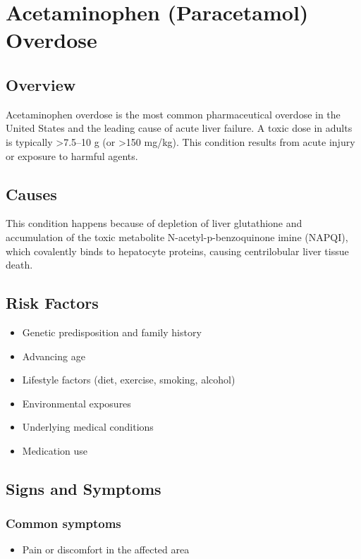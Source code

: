 \chapter{Acetaminophen (Paracetamol) Overdose}
\label{sec:Acetaminophen Overdose}

\section{Overview}
Acetaminophen overdose is the most common pharmaceutical overdose in the United States and the leading cause of acute liver failure. A toxic dose in adults is typically >7.5--10 g (or >150 mg/kg). This condition results from acute injury or exposure to harmful agents.
\section{Causes}
This condition happens because of depletion of liver glutathione and accumulation of the toxic metabolite N-acetyl-p-benzoquinone imine (NAPQI), which covalently binds to hepatocyte proteins, causing centrilobular liver tissue death.     
\section{Risk Factors}

\begin{itemize}[noitemsep]
  \item Genetic predisposition and family history
  \item Advancing age
  \item Lifestyle factors (diet, exercise, smoking, alcohol)
  \item Environmental exposures
  \item Underlying medical conditions
  \item Medication use
\end{itemize}
\section{Signs and Symptoms}

\subsection{Common symptoms}
\begin{itemize}[noitemsep]
  \item Pain or discomfort in the affected area
  \end{itemize}

